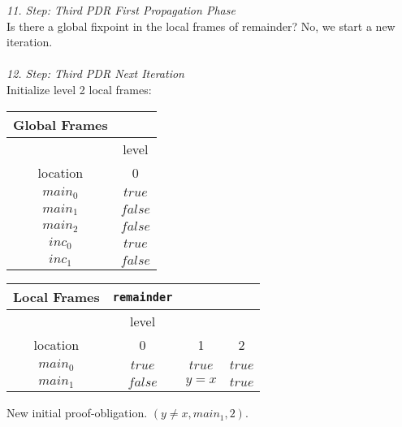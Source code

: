 \documentclass{article}
\begin{document}
	\textsl{11. Step: Third PDR First Propagation Phase} \\
	Is there a global fixpoint in the local frames of remainder? No, we start a new iteration. \\ \\
	
	\textsl{12. Step: Third PDR Next Iteration} \\
	Initialize level 2 local frames:
	
			\begin{minipage}{.4\textwidth}
		\setlength\tabcolsep{0.35em}
		\begin{center}
			\begin{tabu}{cc}
				Global Frames \\
				\toprule
				& level \\
				\cmidrule(lr){2-2}
				location & 0 \\
				$main_0$ & $true$ \\
				$main_1$ & $false$ \\
				$main_2$ & $false$ \\
				$inc_0$ & $true$ \\
				$inc_1$ & $false$\\
				\bottomrule
			\end{tabu}
		\end{center}
	\end{minipage}
	\hfill
	\begin{minipage}{.5\textwidth}
		\setlength\tabcolsep{0.35em}
		\begin{center}
			\begin{tabu}{cccc}
				Local Frames & \texttt{remainder}\\
				\toprule
				& level \\
				\cmidrule(lr){2-4}
				location & 0 & 1 & 2 \\
				\cmidrule{1-4}
				$main_0$ & $true$ & $true$ & $true$ \\
				$main_1$ & $false$ & $y = x$ & $true$\\
				\bottomrule
			\end{tabu}
		\end{center}	
	\end{minipage}
	
	\vspace*{2em}
	New initial proof-obligation. $(y \neq x, main_1, 2)$. \\ \\
	
\end{document}

